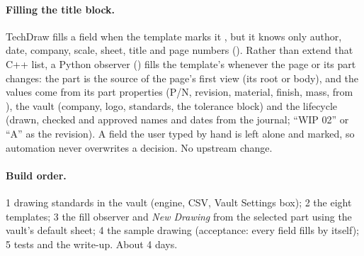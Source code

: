 \paragraph{Filling the title block.} TechDraw fills a field when the template marks it , but it
knows only author, date, company, scale, sheet, title and page numbers (). Rather
than extend that C++ list, a Python observer () fills the template's 
whenever the page or its part changes: the part is the source of the page's first view (its root  or
body), and the values come from its part properties (P/N, revision, material, finish, mass, from
), the vault (company, logo, standards, the tolerance block) and the lifecycle (drawn, checked and
approved names and dates from the journal; ``WIP 02'' or ``A'' as the revision). A field the user typed by hand is left
alone and marked, so automation never overwrites a decision. No upstream change.

\paragraph{Build order.} 1 drawing standards in the vault (engine, CSV, Vault Settings box); 2 the eight templates;
3 the fill observer and \emph{New Drawing} from the selected part using the vault's default sheet; 4 the 
sample drawing (acceptance: every field fills by itself); 5 tests and the write-up. About 4 days.
